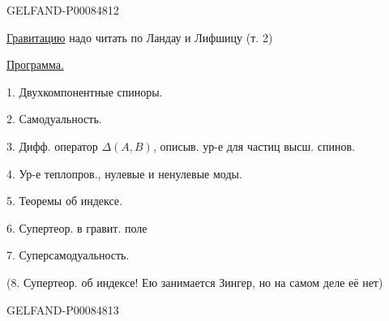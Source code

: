 \begin{GelfandAdjacentEvidence}{GELFAND-P000848}{12}


\uline{Гравитацию} надо читать по Ландау и Лифшицу (т. 2)



\uline{Программа.}

1. Двухкомпонентные спиноры.

2. Самодуальность.

3. Дифф. оператор \(\Delta(A,B)\), описыв. ур-е для частиц высш. спинов.

4. Ур-е теплопров., нулевые и ненулевые моды.

5. Теоремы об индексе.

6. Супертеор. в гравит. поле

7. Суперсамодуальность.

(8. Супертеор. об индексе! Ею занимается Зингер, но на самом деле её нет)
\end{GelfandAdjacentEvidence}
\begin{GelfandAdjacentEvidence}{GELFAND-P000848}{13}

\end{GelfandAdjacentEvidence}



